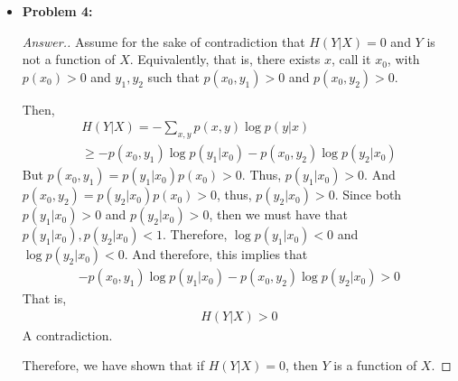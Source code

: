 \documentclass[10pt,twoside]{article}
\begin{document}
\begin{itemize}
\begin{proof}[Answer.]
    Therefore, $\log(p(x|g(x))\leq 0$ and so $\log(\frac{1}{p(x|g(x))})\geq 0$. And $p(x,g(x))\geq 0$. Thus,
    \begin{gather*}
        H(X|g(X)) =  -\sum_x p(x,g(x))\log(p(x|g(x))) = \sum_x p(x,g(x))\log(\frac{1}{p(x|g(x))}) \geq 0
    \end{gather*}
    Since $H(X|g(X))\geq 0$, we have that $H(X,g(X)) = H(g(X)) + H(X|g(X)) \geq H(g(X))$. Putting this all together, we have shown that,
    \begin{gather*}
    H(X,g(X)) = H(X) + H(g(X)|X) = H(X)  \\
    H(X,g(X)) = H(g(X)) + H(X|g(X))\geq H(g(X))\end{gather*}
    \end{proof}
    
    \item\textbf{Problem 4:} \newline
    \noindent\makebox[\linewidth]{\rule{18cm}{0.4pt}}
    \begin{proof}[Answer.]
    Assume for the sake of contradiction that $H(Y|X) = 0$ and $Y$ is not a function of $X$. Equivalently, that is, there exists $x$, call it $x_0$, with
    $p(x_0)>0$ and $y_1,y_2$ such that $p(x_0,y_1)>0$ and $p(x_0,y_2)>0$.

    Then, \begin{gather*}
        H(Y|X) = -\sum_{x,y} p(x,y)\log p(y|x) \\
        \geq -p(x_0,y_1)\log p(y_1|x_0) - p(x_0,y_2)\log p(y_2|x_0)
    \end{gather*}
    But $p(x_0,y_1) = p(y_1|x_0)p(x_0) > 0$. Thus, $p(y_1|x_0)>0$. And $p(x_0,y_2)= p(y_2|x_0)p(x_0)>0$, thus, $p(y_2|x_0)>0$. Since both $p(y_1|x_0)>0$ and $p(y_2|x_0)>0$, then we must have that $p(y_1|x_0),p(y_2|x_0)<1$. Therefore, $\log p(y_1|x_0) < 0$ and $\log p(y_2|x_0) < 0$. And therefore, this implies that
    \begin{gather*}
        -p(x_0,y_1)\log p(y_1|x_0) - p(x_0,y_2)\log p(y_2|x_0) > 0
    \end{gather*}
    That is,
    \begin{gather*}
        H(Y|X) > 0
    \end{gather*}
    A contradiction.

    Therefore, we have shown that if $H(Y|X) = 0$, then $Y$ is a function of $X$.
    \end{proof}

\newpage
    

\end{itemize}
\end{document}
